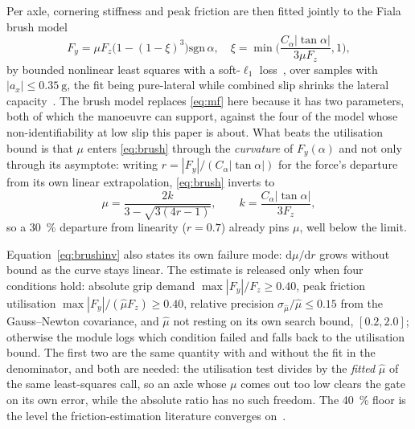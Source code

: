 Per axle, cornering stiffness and peak friction are then fitted jointly to the
Fiala brush model~\cite{fiala1954,svendenius2004brush,pacejka2012book}
\begin{equation}
F_{y}=\mu F_{z}\big(1-(1-\xi)^{3}\big)\mathrm{sgn}\,\alpha,\quad
\xi=\min\!\Big(\frac{C_{\alpha}|\tan\alpha|}{3\mu F_{z}},1\Big),
\label{eq:brush}
\end{equation}
by bounded nonlinear least squares with a soft-$\ell_{1}$
loss~\cite{virtanen2020scipy,branch1999trust}, over samples with
$|a_{x}|\le\SI{0.35}{\g}$, the fit being pure-lateral while combined slip
shrinks the lateral capacity~\cite{acosta2017friction}. The brush model
replaces
\eqref{eq:mf} here because it has two parameters, both of which the manoeuvre
can support, against the four of the model whose non-identifiability at low slip
this paper is about. What beats the utilisation bound is that $\mu$ enters
\eqref{eq:brush} through the \emph{curvature} of $F_{y}(\alpha)$ and not only
through its asymptote: writing $r=|F_{y}|/(C_{\alpha}|\tan\alpha|)$ for the force's
departure from its own linear extrapolation, \eqref{eq:brush} inverts to
\begin{equation}
\mu=\frac{2k}{3-\sqrt{3(4r-1)}},\qquad k=\frac{C_{\alpha}|\tan\alpha|}{3F_{z}},
\label{eq:brushinv}
\end{equation}
so a \SI{30}{\percent} departure from linearity ($r=0.7$) already pins $\mu$,
well below the limit.

Equation~\eqref{eq:brushinv} also states its own failure mode:
$\mathrm{d}\mu/\mathrm{d}r$ grows without bound as the curve stays linear. The
estimate is released only when four conditions hold: absolute grip demand
$\max|F_{y}|/F_{z}\ge\num{0.40}$, peak friction utilisation
$\max|F_{y}|/(\hat\mu F_{z})\ge\num{0.40}$, relative precision
$\sigma_{\hat\mu}/\hat\mu\le\num{0.15}$ from the Gauss--Newton covariance, and
$\hat\mu$ not resting on its own search bound, $[\num{0.2},\num{2.0}]$;
otherwise the module logs which condition failed and falls back to the
utilisation bound. The first two are the
same quantity with and without the fit in the denominator, and both are needed:
the utilisation test divides by the \emph{fitted} $\hat\mu$ of the same
least-squares call, so an axle whose $\mu$ comes out too low clears the gate on
its own error, while the absolute ratio has no such freedom. The
\SI{40}{\percent} floor is the level the friction-estimation literature
converges on~\cite{acosta2017friction}.

